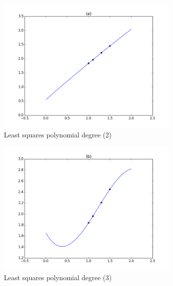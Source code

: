 \documentclass[10pt]{article}
\theoremstyle{plain}
\theoremstyle{definition}
\numberwithin{equation}{section}
\begin{document}

\begin{figure}[p]
    \begin{center}
        \includegraphics[width=0.8\textwidth]{p1_2}
        \caption{Least squares polynomial degree (2)}
    \end{center}
\end{figure}

\begin{figure}[p]
    \begin{center}
        \includegraphics[width=0.8\textwidth]{p1_3}
        \caption{Least squares polynomial degree (3)}
    \end{center}
\end{figure}
\end{document}
